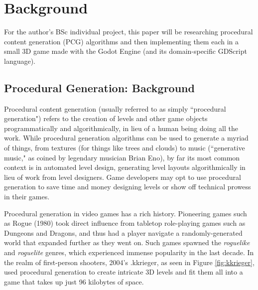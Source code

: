 \chapter{Background} \label{Background}

For the author's BSc individual project, this paper will be researching procedural content generation (PCG) algorithms and then implementing them each in a small 3D game made with the Godot Engine (and its domain-specific GDScript language).

\section{Procedural Generation: Background}

Procedural content generation (usually referred to as simply ``procedural generation") refers to the creation of levels and other game objects programmatically and algorithmically, in lieu of a human being doing all the work. While procedural generation algorithms can be used to generate a myriad of things, from textures (for things like trees and clouds) to music (``generative music," as coined by legendary musician Brian Eno), by far its most common context is in automated level design, generating level layouts algorithmically in lieu of work from level designers. Game developers may opt to use procedural generation to save time and money designing levels or show off technical prowess in their games.

Procedural generation in video games has a rich history. Pioneering games such as Rogue (1980) took direct influence from tabletop role-playing games such as Dungeons and Dragons\cite{roguebasin}, and thus had a player navigate a randomly-generated world that expanded further as they went on. Such games spawned the \emph{roguelike} and \emph{roguelite} genres, which experienced immense popularity in the last decade. In the realm of first-person shooters, 2004's .kkrieger, as seen in Figure \ref{fig:kkrieger}, used procedural generation to create intricate 3D levels and fit them all into a game that takes up just 96 kilobytes of space. 

